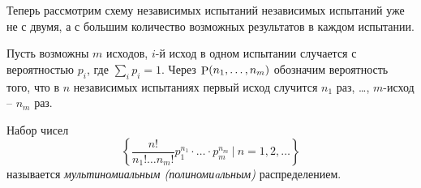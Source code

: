 Теперь рассмотрим схему независимых испытаний независимых испытаний уже не с двумя, а с большим количество возможных результатов в каждом испытании. 

Пусть возможны $m$ исходов, $i$-й исход в одном испытании случается с вероятностью $p_i$, где $\sum_i p_i = 1$. Через $\P(n_1, \ldots, n_m)$ обозначим вероятность того, что в $n$ независимых испытаниях первый исход случится $n_1$ раз, \ldots, $m$-исход -- $n_m$ раз.


\begin{to_def}[$\mathfrak D$]
    Набор чисел
    \begin{equation*}
         \left\{
         \frac{n!}{n_1! \ldots n_m!} p_1^{n_1} \cdot \ldots \cdot p_m^{n_m}
         \ \bigg| \ n = 1, 2,  \ldots\right\}
    \end{equation*} 
    называется \textit{мультиномиальным (полиномиaльным)} распределением.
\end{to_def}

